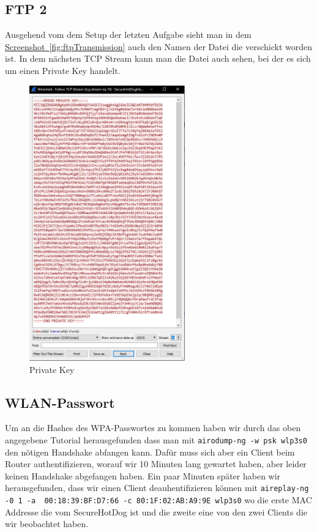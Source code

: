 \documentclass[12pt,a4paper,titlepage,oneside]{scrartcl}
\begin{document}
\subsection{FTP 2} \label{FTP2}

Ausgehend vom dem Setup der letzten Aufgabe sieht man in dem \hyperref[fig:ftpTransmission]{Screenshot~\ref*{fig:ftpTransmission}} auch den Namen der Datei die verschickt worden ist. In dem nächsten TCP Stream kann man die Datei auch sehen, bei der es sich um einen Private Key handelt.

\begin{figure}[h!]
  \centering
    \includegraphics[width=0.6\textwidth]{./imgs/intranet_screenshots/privateKey.png}
  \caption{Private Key}
  \label{fig:privateKey}
\end{figure}

\subsection{WLAN-Passwort} \label{wlanpwd}

Um an die Hashes des WPA-Passwortes zu kommen haben wir durch das oben angegebene Tutorial herausgefunden dass man mit \lstinline{airodump-ng -w psk wlp3s0} den nötigen Handshake abfangen kann. Dafür muss sich aber ein Client beim Router authentifizieren, worauf wir 10 Minuten lang gewartet haben, aber leider keinen Handshake abgefangen haben. Ein paar Minuten später haben wir herausgefunden, dass wir einen Client deauhentifizieren können mit \lstinline{aireplay-ng -0 1 -a  00:18:39:BF:D7:66 -c 80:1F:02:AB:A9:9E wlp3s0} wo die erste MAC Addresse die vom SecureHotDog ist und die zweite eine von den zwei Clients die wir beobachtet haben.
\end{document}

